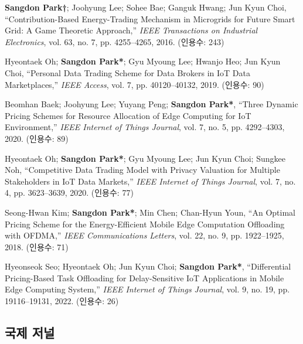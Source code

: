 \documentclass[11pt,a4paper]{article}
\begin{document}
\begin{enumerate}[label={[{\arabic*}]}, leftmargin=*, itemsep=0.3em]
\item \textbf{Sangdon Park†}; Joohyung Lee; Sohee Bae; Ganguk Hwang; Jun Kyun Choi, ``Contribution-Based Energy-Trading Mechanism in Microgrids for Future Smart Grid: A Game Theoretic Approach,'' \textit{IEEE Transactions on Industrial Electronics}, vol. 63, no. 7, pp. 4255--4265, 2016. (인용수: 243)

\item Hyeontaek Oh; \textbf{Sangdon Park*}; Gyu Myoung Lee; Hwanjo Heo; Jun Kyun Choi, ``Personal Data Trading Scheme for Data Brokers in IoT Data Marketplaces,'' \textit{IEEE Access}, vol. 7, pp. 40120--40132, 2019. (인용수: 90)

\item Beomhan Baek; Joohyung Lee; Yuyang Peng; \textbf{Sangdon Park*}, ``Three Dynamic Pricing Schemes for Resource Allocation of Edge Computing for IoT Environment,'' \textit{IEEE Internet of Things Journal}, vol. 7, no. 5, pp. 4292--4303, 2020. (인용수: 89)

\item Hyeontaek Oh; \textbf{Sangdon Park*}; Gyu Myoung Lee; Jun Kyun Choi; Sungkee Noh, ``Competitive Data Trading Model with Privacy Valuation for Multiple Stakeholders in IoT Data Markets,'' \textit{IEEE Internet of Things Journal}, vol. 7, no. 4, pp. 3623--3639, 2020. (인용수: 77)

\item Seong-Hwan Kim; \textbf{Sangdon Park*}; Min Chen; Chan-Hyun Youn, ``An Optimal Pricing Scheme for the Energy-Efficient Mobile Edge Computation Offloading with OFDMA,'' \textit{IEEE Communications Letters}, vol. 22, no. 9, pp. 1922--1925, 2018. (인용수: 71)

\item Hyeonseok Seo; Hyeontaek Oh; Jun Kyun Choi; \textbf{Sangdon Park*}, ``Differential Pricing-Based Task Offloading for Delay-Sensitive IoT Applications in Mobile Edge Computing System,'' \textit{IEEE Internet of Things Journal}, vol. 9, no. 19, pp. 19116--19131, 2022. (인용수: 26)
\end{enumerate}

\subsection{국제 저널}
\end{document}
